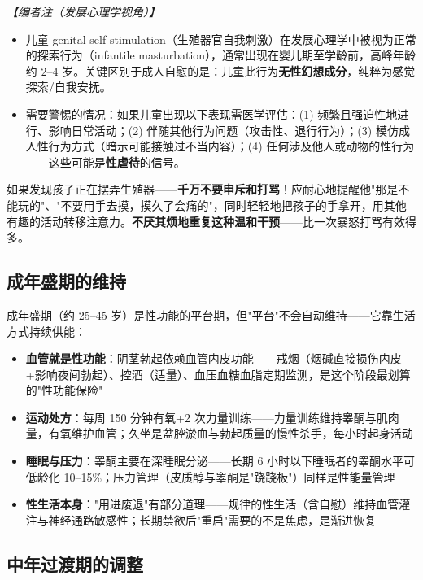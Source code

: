 \vspace{0.3em}
\noindent\textit{【编者注（发展心理学视角）】}
\begin{itemize}
	\item 儿童 genital self-stimulation（生殖器官自我刺激）在发展心理学中被视为正常的探索行为（infantile masturbation），通常出现在婴儿期至学龄前，高峰年龄约 $2$--$4$ 岁。关键区别于成人自慰的是：儿童此行为\textbf{无性幻想成分}，纯粹为感觉探索/自我安抚。
	\item 需要警惕的情况：如果儿童出现以下表现需医学评估：(1) 频繁且强迫性地进行、影响日常活动；(2) 伴随其他行为问题（攻击性、退行行为）；(3) 模仿成人性行为方式（暗示可能接触过不当内容）；(4) 任何涉及他人或动物的性行为——这些可能是\textbf{性虐待}的信号。
\end{itemize}

\begin{tcolorbox}[colback=pink!5!white,colframe=red!50!black,title=贴心小叮咛]
如果发现孩子正在摆弄生殖器——\textbf{千万不要申斥和打骂}！应耐心地提醒他"那是不能玩的"、"不要用手去摸，摸久了会痛的"，同时轻轻地把孩子的手拿开，用其他有趣的活动转移注意力。\textbf{不厌其烦地重复这种温和干预}——比一次暴怒打骂有效得多。
\end{tcolorbox}

\subsection{成年盛期的维持}


成年盛期（约 25--45 岁）是性功能的平台期，但"平台"不会自动维持——它靠生活方式持续供能：

\begin{itemize}
	\item \textbf{血管就是性功能}：阴茎勃起依赖血管内皮功能——戒烟（烟碱直接损伤内皮+影响夜间勃起）、控酒（适量）、血压血糖血脂定期监测，是这个阶段最划算的"性功能保险"
	\item \textbf{运动处方}：每周 150 分钟有氧+2 次力量训练——力量训练维持睾酮与肌肉量，有氧维护血管；久坐是盆腔淤血与勃起质量的慢性杀手，每小时起身活动
	\item \textbf{睡眠与压力}：睾酮主要在深睡眠分泌——长期 6 小时以下睡眠者的睾酮水平可低龄化 10--15\%；压力管理（皮质醇与睾酮是"跷跷板"）同样是性能量管理
	\item \textbf{性生活本身}："用进废退"有部分道理——规律的性生活（含自慰）维持血管灌注与神经通路敏感性；长期禁欲后"重启"需要的不是焦虑，是渐进恢复
\end{itemize}

\subsection{中年过渡期的调整}


